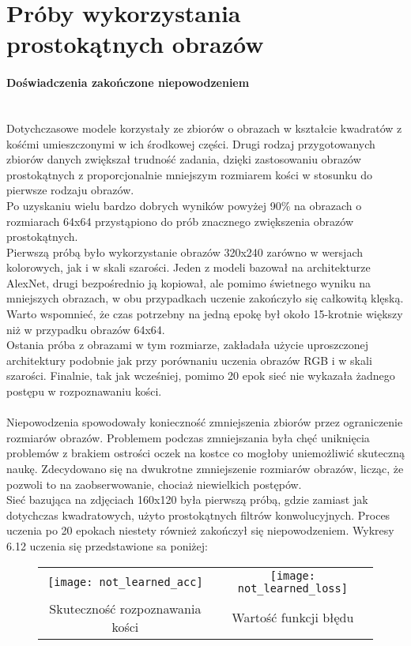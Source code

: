 \section{Próby wykorzystania prostokątnych obrazów}

\paragraph{Doświadczenia zakończone niepowodzeniem} \mbox{}\\
Dotychczasowe modele korzystały ze zbiorów o obrazach w kształcie kwadratów z kośćmi
umieszczonymi w ich środkowej części. Drugi rodzaj przygotowanych zbiorów danych zwiększał
trudność zadania, dzięki zastosowaniu obrazów prostokątnych z proporcjonalnie mniejszym
rozmiarem kości w stosunku do pierwsze rodzaju obrazów.\\
Po uzyskaniu wielu bardzo dobrych wyników powyżej 90\% na obrazach o rozmiarach 64x64
przystąpiono do prób znacznego zwiększenia obrazów prostokątnych.\\
Pierwszą próbą było wykorzystanie obrazów 320x240 zarówno w wersjach kolorowych, jak i w skali szarości.
Jeden z modeli bazował na architekturze AlexNet, drugi bezpośrednio
ją kopiował, ale pomimo świetnego wyniku na mniejszych obrazach, w obu przypadkach
uczenie zakończyło się całkowitą klęską. Warto wspomnieć, że czas potrzebny na
jedną epokę był około 15-krotnie większy niż w przypadku obrazów 64x64.\\
Ostania próba z obrazami w tym rozmiarze, zakładała użycie uproszczonej architektury
podobnie jak przy porównaniu uczenia obrazów RGB i w skali szarości. Finalnie, tak jak
wcześniej, pomimo 20 epok sieć nie wykazała żadnego postępu w rozpoznawaniu kości.\\\\
Niepowodzenia spowodowały konieczność zmniejszenia zbiorów przez ograniczenie rozmiarów obrazów.
Problemem podczas zmniejszania była chęć uniknięcia problemów z brakiem ostrości
oczek na kostce co mogłoby uniemożliwić skuteczną naukę. Zdecydowano się na dwukrotne
zmniejszenie rozmiarów obrazów, licząc, że pozwoli to na zaobserwowanie, chociaż niewielkich
postępów.\\
Sieć bazująca na zdjęciach 160x120 była pierwszą próbą, gdzie zamiast jak dotychczas
kwadratowych, użyto prostokątnych filtrów konwolucyjnych. Proces uczenia po 20 epokach
niestety również zakończył się niepowodzeniem. Wykresy 6.12 uczenia się przedstawione sa poniżej: \newpage

\begin{figure}[h!]
\begin{center}
\begin{tabular}{cc}
\texttt{[image: not\_learned\_acc]} &
\texttt{[image: not\_learned\_loss]} \\
 Skuteczność rozpoznawania kości & Wartość funkcji błędu\\
\end{tabular}
\label{fig:not_learned}
\end{center}
\end{figure}

